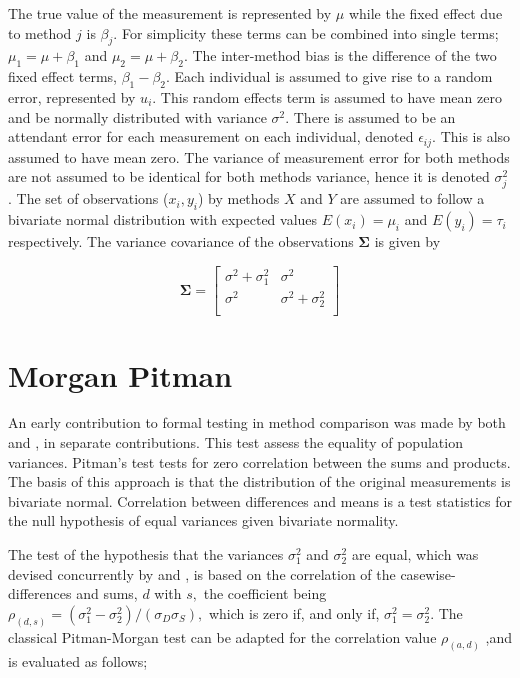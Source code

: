 \documentclass[12pt, a4paper]{report}
\theoremstyle{plain}
\theoremstyle{definition}
\theoremstyle{remark}
\begin{document}
The true value of the measurement is represented by $\mu$ while the fixed effect due to method $j$ is $\beta_{j}$.
For simplicity these terms can be combined into single terms; $\mu_{1} = \mu+ \beta_{1}$ and $\mu_{2} = \mu + \beta_{2}$. The inter-method bias is the difference of the two fixed effect terms, $\beta_{1}-\beta_{2}$. Each individual is assumed to give rise to a random error, represented by $u_{i}$. This random effects term is assumed to have mean zero and be normally distributed with variance $\sigma^2$. There is assumed to be an attendant error for each measurement on each individual, denoted $\epsilon_{ij}$. This is also assumed to have mean zero. The variance of measurement error for both methods are not assumed to be identical for both methods variance,  hence it is denoted $\sigma^2_{j}$. The set of observations ($x_{i},y_{i}$) by methods $X$ and $Y$ are assumed to follow a bivariate normal distribution with expected values $E(x_{i})= \mu_{i}$ and $E(y_{i})= \tau_{i}$ respectively. The variance covariance of the observations $\boldsymbol{\Sigma}$ is given by

\[
\boldsymbol{\Sigma} = \left[
\begin{array}{cc}
\sigma^{2} + \sigma^{2}_{1} & \sigma^{2} \\
\sigma^{2} & \sigma^{2} + \sigma^{2}_{2} \\
\end{array}
\right]
\] 





\section{Morgan Pitman}


An early contribution to formal testing in method comparison was
made by both \citet{Morgan} and \citet{Pitman}, in separate
contributions. This test assess the equality
of population variances. Pitman's test tests for zero correlation
between the sums and products. The basis of this approach is that the
distribution of the original measurements is bivariate normal.
Correlation between differences and means is a test statistics for
the null hypothesis of equal variances given bivariate normality.


The test of the hypothesis that the variances $\sigma^2_1$ and $\sigma^2_2$ are equal, which was devised concurrently by \citet{Pitman} and \citet{Morgan}, 
is based on the correlation of the casewise-differences and sums, $d$ with $s,$ the coefficient being $ \rho_{(d,s)} = (\sigma^2_1 -\sigma^2_2) / ( \sigma_D \sigma_S ),$ which is zero if, and only
if, $\sigma^2_1 = \sigma^2_2.$ The classical Pitman-Morgan test can be adapted for the correlation value $\rho_{(a,d)}$ ,and
is evaluated as follows;
\end{document}
